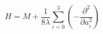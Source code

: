 \begin{equation}
H=M+\frac{1}{8\lambda} \sum_{i=0}^3(-\frac{\partial^2}{\partial a_i^2})
\end{equation}

